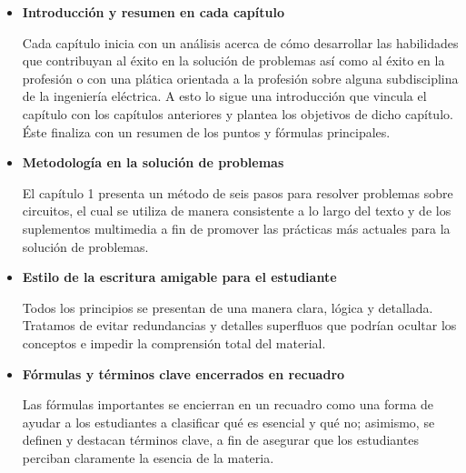 \begin{itemize}
	\item \textbf{Introducción y resumen en cada capítulo} 
	
	Cada capítulo inicia con un análisis acerca de cómo desarrollar las habilidades que contribuyan al éxito en la solución de problemas así como al éxito en la profesión o con una plática orientada a la profesión sobre alguna subdisciplina de la ingeniería  eléctrica. A esto lo sigue una introducción que vincula el capítulo con los capítulos anteriores y plantea los objetivos de dicho capítulo. Éste finaliza con un resumen de los puntos y fórmulas principales.
	
	\item \textbf{Metodología en la solución de problemas}
	
El capítulo 1 presenta un método de seis pasos para resolver problemas
sobre circuitos, el cual se utiliza de manera consistente a lo largo del texto y de los suplementos multimedia a fin de promover las prácticas más actuales para la solución de problemas.

	\item \textbf{Estilo de la escritura amigable para el estudiante}
	
Todos los principios se presentan de una manera clara, lógica y detallada. Tratamos de evitar redundancias y detalles superfluos que podrían ocultar los conceptos e impedir la comprensión total del material.

	\item \textbf{Fórmulas y términos clave encerrados en recuadro}
	
Las fórmulas importantes se encierran en un recuadro como una forma de ayudar a los estudiantes a clasificar qué es esencial y qué no; asimismo, se definen y destacan términos clave, a fin de asegurar que los estudiantes perciban claramente la esencia de la materia.
\end{itemize}
